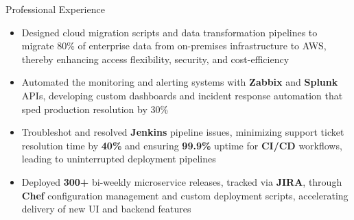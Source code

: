\documentclass{resume}
\begin{document}
\begin{experienceSection}{Professional Experience}
    \experienceItem[
        company={Cerner Healthcare (Oracle Cerner)},
        location={Bangalore, KA},
        position={Software Engineer},
        duration={May 2021 - Jul 2023}
    ]
    \begin{itemize}
        \itemsep -6pt {}
        \item Designed cloud migration scripts and data transformation pipelines to migrate 80\% of enterprise data from on-premises infrastructure to AWS, thereby enhancing access flexibility, security, and cost-efficiency
        \item Automated the monitoring and alerting systems with \textbf{Zabbix} and \textbf{Splunk} APIs, developing custom dashboards and incident response automation that sped production resolution by 30\%
        \item Troubleshot and resolved \textbf{Jenkins} pipeline issues, minimizing support ticket resolution time by \textbf{40\%} and ensuring \textbf{99.9\%} uptime for \textbf{CI/CD} workflows, leading to uninterrupted deployment pipelines
        \item Deployed \textbf{300+} bi-weekly microservice releases, tracked via \textbf{JIRA}, through \textbf{Chef} configuration management and custom deployment scripts, accelerating delivery of new UI and backend features
    \end{itemize}

\end{experienceSection}
\end{document}
